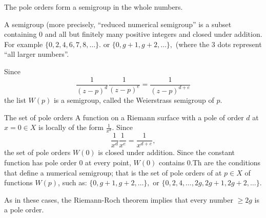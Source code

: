 \documentclass[12pt, aspectratio=169]{beamer}
\begin{document}
\begin{frame}{The pole orders form a \alert{semigroup} in the whole numbers.}
 
 A \alert{semigroup} (more precisely, ``reduced numerical semigroup'' is a subset 
 containing 0 and all but finitely many positive integers and closed under addition. For
 example 
 $
\{0,2, 4, 6, 7, 8,\dots\}.
 $
or 
$
 \{0,g+1,g+2,\dots\},
 $
(where the 3 dots represent ``all larger numbers''.
\bigskip

Since
$$
\frac{1}{(z-p)^d}\frac{1}{(z-p)^e} = \frac{1}{(z-p)^{d+e}}
$$
the list $W(p)$ is  a semigroup,
called the \alert{Weierstrass semigroup} of $p$.

\end{frame}
\begin{frame}{The set of pole orders}
A function on a Riemann surface with a pole of order $d$ at $x = 0\in X$ is locally of the form
$
\frac{1}{x^d} .
$
Since 
$$
\frac{1}{x^d} \frac{1}{x^e} = \frac{1}{x^{d + e}}, 
$$
 the set of pole orders $W(0)$ is \alert{closed under addition}.  Since the constant function has pole order 0 at every point, $W(0)$ contains 0.Th are the conditions that define a \alert{numerical semigroup}; that is the set of pole orders of  at $p\in X$ of functions $W(p)$, such as:
 $
\{0,g+1,g+2,\dots\},
 $
 or
$
\{0,2, 4,\dots, 2g, 2g+1,2g+2,\dots\}.
 $
\bigskip

 As in these cases, the Riemann-Roch theorem implies that every number $\geq 2g$ is a pole order.

 
\end{frame}
\end{document}
